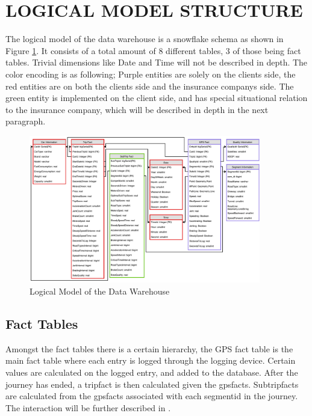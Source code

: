 \section{LOGICAL MODEL STRUCTURE}\label{sec:dataware}

The logical model of the data warehouse is a snowflake schema as shown in Figure \ref{fig:datawarehouse}. It consists of a total amount of 8 different tables, 3 of those being fact tables. Trivial dimensions like Date and Time will not be described in depth. The color encoding is as following; Purple entities are solely on the clients side, the red entities are on both the clients side and the insurance companys side. The green entity is implemented on the client side, and has special situational relation to the insurance company, which will be described in depth in the next paragraph.

\begin{figure}[tb]
\centering
\includegraphics[width=0.9\textwidth]{Pictures/ERDiagram}
\caption{Logical Model of the Data Warehouse}
\label{fig:datawarehouse}
\end{figure}

\subsection{Fact Tables}

Amongst the fact tables there is a certain hierarchy, the GPS fact table is the main fact table where each entry is logged through the logging device. Certain values are calculated on the logged entry, and added to the database. After the journey has ended, a tripfact is then calculated given the gpsfacts. Subtripfacts are calculated from the gpsfacts associated with each segmentid in the journey. The interaction will be further described in .

